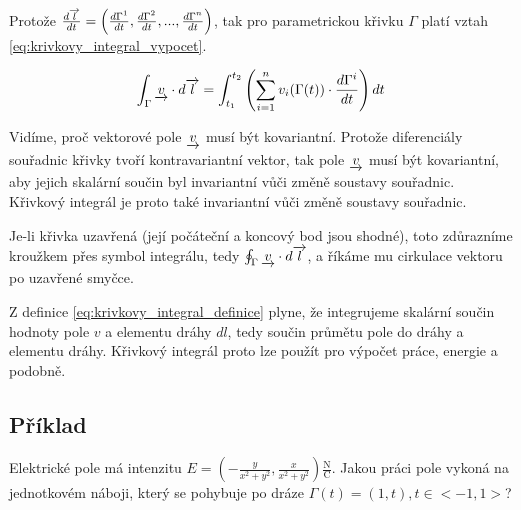 Protože \(\frac{d\overrightarrow{l}}{dt} = \left(\frac{d \Gamma^1}{dt}, \frac{d \Gamma^2}{dt}, ..., \frac{d \Gamma^n}{dt} \right)\), tak pro parametrickou křivku
\(\Gamma\) platí vztah \eqref{eq:krivkovy_integral_vypocet}.

\begin{equation}
\label{eq:krivkovy_integral_vypocet}
\begin{split}
\int_\Gamma \underrightarrow{v} \cdot d\overrightarrow{l} =
\int_{t_1}^{t_2} \left(\sum_{i=1}^n v_i(\Gamma(t)) \cdot \frac{d \Gamma^i}{dt} \right) dt
\end{split}
\end{equation}

Vidíme, proč vektorové pole \(\underrightarrow{v}\) musí být kovariantní. Protože diferenciály souřadnic křivky tvoří kontravariantní vektor, tak pole \(\underrightarrow{v}\) musí být kovariantní, aby jejich skalární součin byl invariantní vůči změně soustavy souřadnic. Křivkový integrál je proto také invariantní vůči změně soustavy souřadnic.

Je-li křivka uzavřená (její počáteční a koncový bod jsou shodné), toto zdůrazníme kroužkem přes symbol integrálu, tedy \(\oint_\Gamma \underrightarrow{v} \cdot d\overrightarrow{l}\), a říkáme mu cirkulace vektoru po uzavřené smyčce.

Z definice \eqref{eq:krivkovy_integral_definice} plyne, že integrujeme skalární součin hodnoty pole \(v\) a elementu dráhy \(dl\),
tedy součin průmětu pole do dráhy a elementu dráhy. Křivkový integrál proto lze použít pro výpočet práce, energie a podobně.


\subsection{Příklad}

Elektrické pole má intenzitu \(E = \left(-\frac{y}{x^2+y^2}, \frac{x}{x^2+y^2}\right) \frac{\mathrm{N}}{\mathrm{C}}\). Jakou práci pole vykoná na jednotkovém náboji, který se pohybuje po dráze \(\Gamma(t) = (1, t), t \in <-1, 1>\)?




